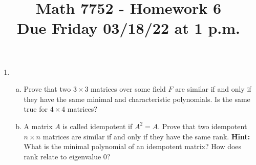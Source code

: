 \documentclass[12pt,
psamsfonts]{amsart}
\title{Math 7752 - Homework 6\\
Due Friday 03/18/22 at 1 p.m.}
\theoremstyle{remark}
\theoremstyle{definition}
\newcommand{\Q}{\mathbb{Q}\xspace}
\numberwithin{equation}{section}
\begin{document}
\maketitle

\begin{enumerate}
\item \begin{enumerate}
[(a)]\item Prove that two $3\times 3$ matrices over some field $F$ are similar if and only if they have the same minimal and characteristic polynomials. Is the same true for $4\times 4$ matrices? 
\item A matrix $A$ is called idempotent if $A^2=A$. Prove that two idempotent $n\times n$ matrices are similar if and only if they have the same rank. \textbf{Hint:} What is the minimal polynomial of an idempotent matrix? How does rank relate to eigenvalue $0$? 
\end{enumerate}
\medskip
\medskip


\end{enumerate}
\end{document}
